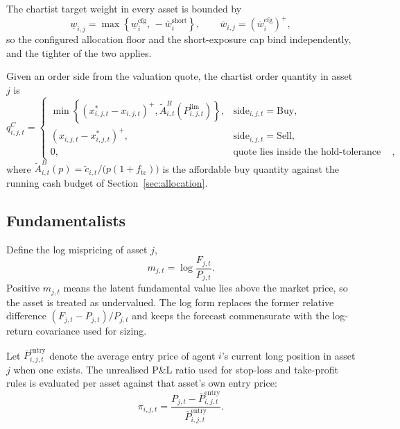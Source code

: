 \documentclass[12pt, a4paper]{article}
\newcommand{\pospart}[1]{\left(#1\right)^{+}}
\begin{document}
    The chartist target weight in every asset is bounded by
    \[
        \underline w_{i,j}=\max\left\{\underline w_i^{\text{cfg}},\,-\bar w_i^{\text{short}}\right\},
        \qquad
        \overline w_{i,j}=\pospart{\overline w_i^{\text{cfg}}},
    \]
    so the configured allocation floor and the short-exposure cap bind
    independently, and the tighter of the two applies.

    Given an order side from the valuation quote, the chartist order quantity in
    asset \(j\) is
    \[
        q_{i,j,t}^{C}=
        \begin{cases}
            \min\left\{\pospart{x_{i,j,t}^{\ast}-x_{i,j,t}},\tilde A_{i,t}^{B}(P_{i,j,t}^{\text{lim}})\right\}, & \mathrm{side}_{i,j,t}=\mathrm{Buy},\\[1.2ex]
            \pospart{x_{i,j,t}-x_{i,j,t}^{\ast}}, & \mathrm{side}_{i,j,t}=\mathrm{Sell},\\
            0, & \text{quote lies inside the hold-tolerance band},
        \end{cases}
    \]
    where \(\tilde A_{i,t}^{B}(p)=\tilde c_{i,t}/\bigl(p(1+f_{\mathrm{tc}})\bigr)\)
    is the affordable buy quantity against the running cash budget of
    Section~\ref{sec:allocation}.

    \subsection{Fundamentalists}
    Define the log mispricing of asset \(j\),
    \[
        m_{j,t}=\log\frac{F_{j,t}}{P_{j,t}}.
    \]
    Positive \(m_{j,t}\) means the latent fundamental value lies above the market
    price, so the asset is treated as undervalued. The log form replaces the
    former relative difference \((F_{j,t}-P_{j,t})/P_{j,t}\) and keeps the
    forecast commensurate with the log-return covariance used for sizing.

    Let \(\bar P_{i,j,t}^{\text{entry}}\) denote the average entry price of agent
    \(i\)'s current long position in asset \(j\) when one exists. The unrealised
    P\&L ratio used for stop-loss and take-profit rules is evaluated per asset
    against that asset's own entry price:
    \[
        \pi_{i,j,t}=\frac{P_{j,t}-\bar P_{i,j,t}^{\text{entry}}}{\bar P_{i,j,t}^{\text{entry}}}.
    \]
\end{document}
